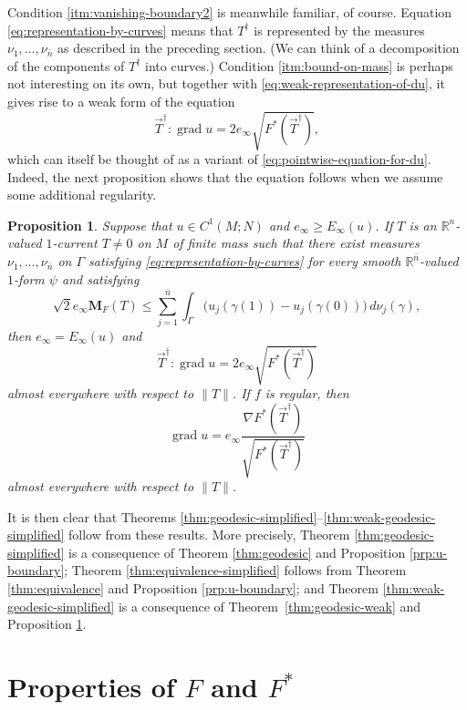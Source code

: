 \documentclass[a4paper]{article}
\newcommand{\R}{\mathbb{R}}
\newcommand{\M}{\mathbf{M}}
\newcommand{\ndim}{{\bar{n}}}
\DeclareMathOperator{\grad}{grad}
\newtheorem{proposition}[theorem]{Proposition}
\theoremstyle{definition}
\theoremstyle{remark}
\begin{document}
Condition \ref{itm:vanishing-boundary2} is meanwhile familiar, of course.
Equation \eqref{eq:representation-by-curves} means that $T^\dagger$ is represented by the
measures $\nu_1, \dotsc, \nu_\ndim$ as described in the preceding section.
(We can think of a decomposition of the
components of $T^\dagger$ into curves.)
Condition \ref{itm:bound-on-mass} is perhaps not interesting on its own,
but together with \eqref{eq:weak-representation-of-du}, it gives rise to
a weak form of the equation
\[
\vec{T}^\dagger : \grad u = 2 e_\infty \sqrt{F^*(\vec{T}^\dagger)},
\]
which can itself be thought of as a variant of \eqref{eq:pointwise-equation-for-du}.
Indeed, the next proposition shows that the equation follows when we assume
some additional regularity.

\begin{proposition} \label{prp:consistency}
Suppose that $u \in C^1(M; N)$ and $e_\infty \ge E_\infty(u)$. If $T$ is an
$\R^n$-valued $1$-current $T \neq 0$ on $M$ of finite mass such that there exist measures
$\nu_1, \dotsc, \nu_\ndim$ on $\Gamma$
satisfying \eqref{eq:representation-by-curves} for every smooth $\R^\ndim$-valued
$1$-form $\psi$ and satisfying
\[
\sqrt{2}e_\infty \M_F(T) \le \sum_{j = 1}^\ndim \int_\Gamma \bigl(u_j(\gamma(1)) - u_j(\gamma(0))\bigr) \, d\nu_j(\gamma),
\]
then $e_\infty = E_\infty(u)$ and
\[
\vec{T}^\dagger : \grad u = 2 e_\infty \sqrt{F^*(\vec{T}^\dagger)}
\]
almost everywhere with respect to $\|T\|$. If $f$ is regular, then
\[
\grad u = e_\infty \frac{\nabla F^*(\vec{T}^\dagger)}{\sqrt{F^*(\vec{T}^\dagger)}}
\]
almost everywhere with respect to $\|T\|$.
\end{proposition}

It is then clear that Theorems \ref{thm:geodesic-simplified}--\ref{thm:weak-geodesic-simplified} follow from these results. More precisely, Theorem
\ref{thm:geodesic-simplified} is a consequence of
Theorem \ref{thm:geodesic} and Proposition \ref{prp:u-boundary};
Theorem \ref{thm:equivalence-simplified} follows from Theorem \ref{thm:equivalence} and Proposition \ref{prp:u-boundary}; and Theorem \ref{thm:weak-geodesic-simplified} is
a consequence of Theorem~\ref{thm:geodesic-weak} and Proposition \ref{prp:consistency}.








\section{Properties of $F$ and $F^*$} \label{sct:properties-of-F}
\end{document}
